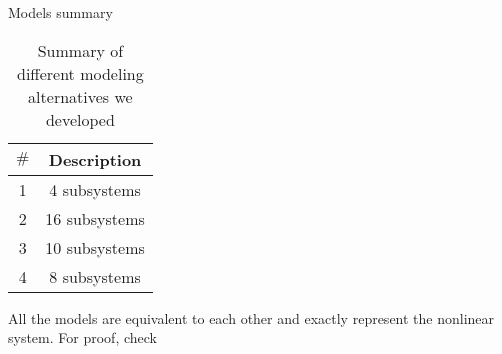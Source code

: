 \begin{frame}{Models summary}
    \begin{table}[]
        \centering
        \begin{tabular}{c|c}
             $\#$ & Description \\ \hline
             1& 4 subsystems \\ \hline
             2& 16 subsystems\\ \hline
             3& 10 subsystems\\ \hline
             4& 8 subsystems\\ \hline
        \end{tabular}
        \caption{Summary of different modeling alternatives we developed}
        \label{tab:my_label}
    \end{table}
    \begin{block}{}
    All the models are equivalent to each other and exactly represent the nonlinear system. For proof, check \cite{Araujo2019}
    \end{block}
\end{frame}


